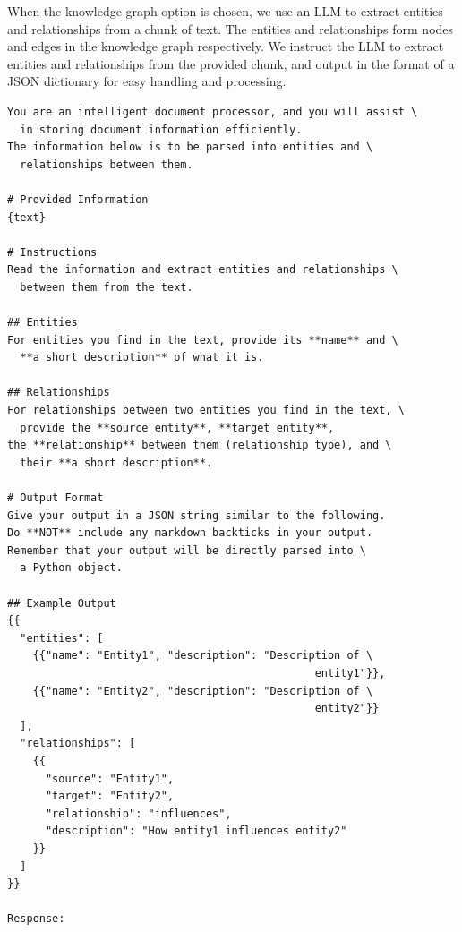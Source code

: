 When the knowledge graph option is chosen, we use an LLM to extract entities and relationships from a chunk of text.
The entities and relationships form nodes and edges in the knowledge graph respectively.
We instruct the LLM to extract entities and relationships from the provided chunk, 
and output in the format of a JSON dictionary for easy handling and processing.
\begin{verbatim}
You are an intelligent document processor, and you will assist \
  in storing document information efficiently.
The information below is to be parsed into entities and \
  relationships between them.

# Provided Information
{text}

# Instructions
Read the information and extract entities and relationships \
  between them from the text.

## Entities
For entities you find in the text, provide its **name** and \
  **a short description** of what it is.

## Relationships
For relationships between two entities you find in the text, \
  provide the **source entity**, **target entity**,
the **relationship** between them (relationship type), and \
  their **a short description**.

# Output Format
Give your output in a JSON string similar to the following.
Do **NOT** include any markdown backticks in your output.
Remember that your output will be directly parsed into \
  a Python object.

## Example Output
{{
  "entities": [
    {{"name": "Entity1", "description": "Description of \
                                                entity1"}},
    {{"name": "Entity2", "description": "Description of \
                                                entity2"}}
  ],
  "relationships": [
    {{
      "source": "Entity1", 
      "target": "Entity2", 
      "relationship": "influences", 
      "description": "How entity1 influences entity2"
    }}
  ]
}}

Response:
\end{verbatim}

